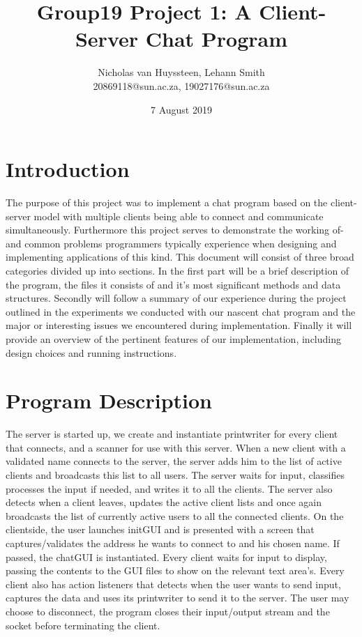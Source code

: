 \documentclass[12pt, a4paper]{article}
\title{Group19 Project 1: A Client-Server Chat Program}
\author{Nicholas van Huyssteen, Lehann Smith\\
	\small{20869118@sun.ac.za, 19027176@sun.ac.za}
}
\date{7 August 2019}
\begin{document}
\maketitle

\section{Introduction}
The purpose of this project was to implement a chat program based on the client-server model with multiple clients being able to connect and communicate simultaneously. Furthermore this project serves to demonstrate the working of- and common problems programmers typically experience when designing and implementing applications of this kind.
This document will  consist of three broad categories divided up into sections.  In the first part will be a brief description of the program, the files it consists of and it's most significant methods and data structures. Secondly will follow a summary of our experience during the project outlined in the experiments we conducted with our nascent chat program and the major or interesting issues we encountered during implementation. Finally it will provide an overview of the pertinent features of our implementation, including design choices and running instructions.

\section{Program Description}
The server is started up, we create and instantiate printwriter for every client that connects, and a scanner for use with this server. When a new client with a validated name connects to the server, the server adds him to the list of active clients and broadcasts this list to all users. The server waits for input, classifies processes the input if needed, and writes it to all the clients. The server also detects when a client leaves, updates the active client lists and once again broadcasts the list of currently active users to all the connected clients.
On the clientside, the user launches initGUI and is presented with a screen that captures/validates the address he wants to connect to and his chosen name. If passed, the chatGUI is instantiated.
Every client waits for input to display, passing the contents to the GUI files to show on the relevant text area's. Every client also has action listeners that detects when the user wants to send input, captures the data and uses its printwriter to send it to the server. The user may choose to disconnect, the program closes their input/output stream and the socket before terminating the client.
\end{document}
